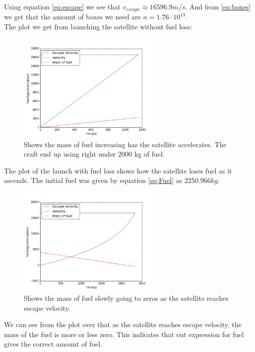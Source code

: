 \documentclass[a4paper, 10pt]{article}
\begin{document}
Using equation \ref{eq:escape} we see that $v_{escape} \approx 16596.9 m/s$. And from \ref{eq:boxes} we get that the amount of boxes we need are $n = 1.76 \cdot 10^{13}$. \\

The plot we get from launching the satellite without fuel loss:


\begin{figure}[H]
\begin{center}
\includegraphics[width = 70mm]{part1launchConstMass.png}
\caption{Shows the mass of fuel increasing has the satellite accelerates. The craft end up using right under 2000 kg of fuel.}
\end{center}
\end{figure}

The plot of the launch with fuel loss shows how the satellite loses fuel as it ascends. The initial fuel was given by equation \ref{eq:Fuel} as $2250.966 kg$.


\begin{figure}[H]
\begin{center}
\includegraphics[width = 70mm]{part1launchVarMass.png}
\caption{Shows the mass of fuel slowly going to zeros as the satellite reaches escape velocity.}
\end{center}
\end{figure}

We can see from the plot over that as the satellite reaches escape velocity, the mass of the fuel is more or less zero. This indicates that out expression for fuel gives the correct amount of fuel.
\end{document}
